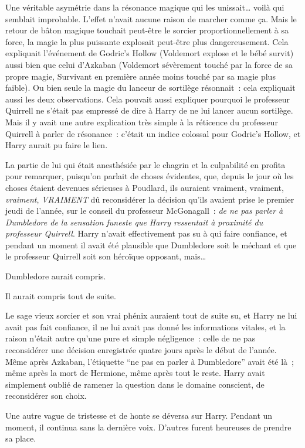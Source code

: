 Une véritable asymétrie dans la résonance magique qui les unissait… voilà qui semblait improbable.
L'effet n'avait aucune raison de marcher comme ça.
Mais le retour de bâton magique touchait peut-être le sorcier proportionnellement à sa force, la magie la plus puissante explosait peut-être plus dangereusement.
Cela expliquait l'événement de Godric's Hollow (Voldemort explose et le bébé survit) aussi bien que celui d'Azkaban (Voldemort sévèrement touché par la force de sa propre magie, Survivant en première année moins touché par sa magie plus faible).
Ou bien seule la magie du lanceur de sortilège résonnait~: cela expliquait aussi les deux observations.
Cela pouvait aussi expliquer pourquoi le professeur Quirrell ne s'était pas empressé de dire à Harry de ne lui lancer aucun sortilège.
Mais il y avait une autre explication très simple à la réticence du professeur Quirrell à parler de résonance~: c'était un indice colossal pour Godric's Hollow, et Harry aurait pu faire le lien.

La partie de lui qui était anesthésiée par le chagrin et la culpabilité en profita pour remarquer, puisqu'on parlait de choses évidentes, que, depuis le jour où les choses étaient devenues sérieuses à Poudlard, ils auraient vraiment, vraiment, \emph{vraiment}, \emph{VRAIMENT} dû reconsidérer la décision qu'ils avaient prise le premier jeudi de l'année, sur le conseil du professeur McGonagall~: \emph{de ne pas parler à Dumbledore de la sensation funeste que Harry ressentait à proximité du professeur Quirrell}.
Harry n'avait effectivement pas su à qui faire confiance, et pendant un moment il avait été plausible que Dumbledore soit le méchant et que le professeur Quirrell soit son héroïque opposant, mais…

Dumbledore aurait compris.

Il aurait compris tout de suite.

Le sage vieux sorcier et son vrai phénix auraient tout de suite su, et Harry ne lui avait pas fait confiance, il ne lui avait pas donné les informations vitales, et la raison n'était autre qu'une pure et simple négligence~: celle de ne pas reconsidérer une décision enregistrée quatre jours après le début de l'année.
Même après Azkaban, l'étiquette “ne pas en parler à Dumbledore” avait été là~; même après la mort de Hermione, même après tout le reste.
Harry avait simplement oublié de ramener la question dans le domaine conscient, de reconsidérer son choix.

Une autre vague de tristesse et de honte se déversa sur Harry.
Pendant un moment, il continua sans la dernière voix.
D'autres furent heureuses de prendre sa place.

